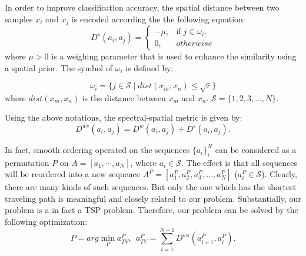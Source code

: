 \documentclass{ws-ijwmip}
\begin{document}
In order to improve classification accuracy, the spatial distance between two samples $x_i$ and $x_j$ is encoded according the the following equation:
 \begin{equation}
  D^s(a_i,a_j) =\left\{\begin{matrix}
-\mu, & \mbox{if} \;j \in {\omega_i}.\\
0,  & otherwise
\end{matrix}\right.
 \label{equ2.8}
\end{equation}
where $\mu > 0$ is a weighing parameter that is used to enhance the similarity using a spatial prior. The symbol of $\omega_i$ is defined by:

 \begin{equation}
  \omega _i = \{j\in \mathcal{S} \mid dist(x_m, x_n) \leqslant \sqrt{r}\}
   \label{equ2.9}
\end{equation}
 where $dist(x_m, x_n)$ is the distance between $x_m$ and $x_n$. $\mathcal{S} = \{1,2,3,\dots,N\}$.
 
 Using the above notations, the spectral-spatial metric is given by:
  \begin{equation}
  D^{ws}(a_i, a_j) = D^w(a_i, a_j) + D^s(a_i, a_j).
   \label{equ2.10}
\end{equation}

In fact, smooth ordering operated on the sequences $\{a_i\}_i^N$ can be considered as a permutation $P$ on $A=[a_1, \cdots, a_N]$, where $a_i \in \mathcal{S}$.
The effect is that all sequences will be reordered into a new sequence $A^P=[a_1^P,a_2^P,a_3^P,\dots,a_N^P]$ ($a_i^P \in \mathcal{S}$). 
Clearly, there are many kinds of such sequences. 
But only the one which has the shortest traveling path is meaningful and closely related to our problem.
Substantially, our problem is a in fact a TSP problem.
Therefore, our problem can be solved by the following optimization:
\begin{equation}
  P = arg \min _P a_{TV}^P, ~~ a_{TV}^P = \sum_{i=1}^{N-1}D^{ws}(a_{i+1}^P,a_i^P).
   \label{equ2.11}
\end{equation}
%

\end{document}
